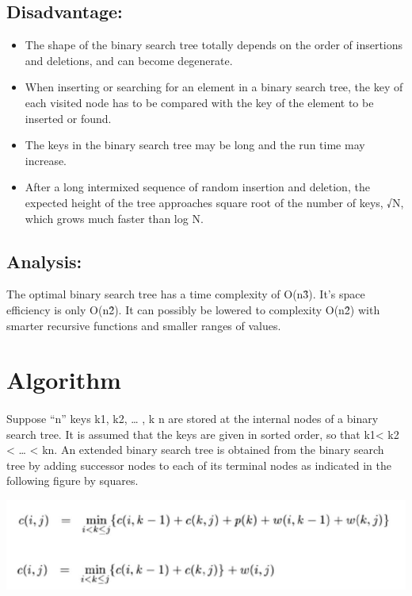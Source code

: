\documentclass[a4paper,12pt]{article}
\begin{document}
	\subsection{Disadvantage:}
	\begin{itemize}
		\item The shape of the binary search tree totally depends on the order of insertions and deletions, and can become degenerate.  
		
		\item When inserting or searching for an element in a binary search tree, the key of each visited node has to be compared with the key of the element to be inserted or found.  
		
		\item The keys in the binary search tree may be long and the run time may increase.  
		
		\item After a long intermixed sequence of random insertion and deletion, the expected height of  	the tree approaches square root of the number of keys, √N, which grows much faster  than log N.  
		
	\end{itemize}
	
	\subsection{Analysis:}
	The optimal binary search tree has a time complexity of O(n\^3). It’s space efficiency is only O(n\^2). It can possibly be lowered to complexity O(n\^2) with smarter recursive functions and smaller ranges of values. 

		
\section{Algorithm}
	\paragraph{} Suppose “n” keys k1, k2, … , k n are stored at the internal nodes of a binary search tree. It is assumed that the keys are given in sorted order, so that k1< k2 < … < kn. An extended binary search tree is obtained from the binary search tree by adding successor nodes to each of its terminal nodes as indicated in the following figure by squares. 
	
	\includegraphics[width=\textwidth]{obst_m1}
\end{document}
